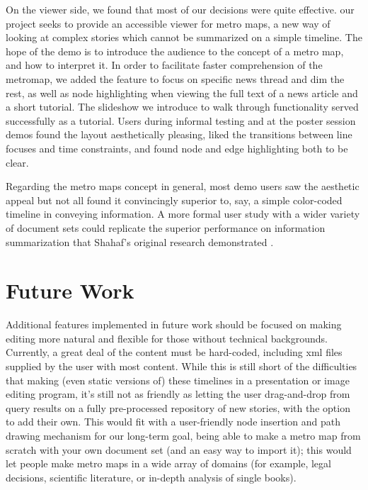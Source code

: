 \documentclass{chi2009}
\begin{document}
On the viewer side, we found that most of our decisions were quite effective. our project seeks to provide an accessible viewer for metro maps, a new way of looking at complex stories which cannot be summarized on a simple timeline. The hope of the demo is to introduce the audience to the concept of a metro map, and how to interpret it.  In order to facilitate faster comprehension of the metromap, we added the feature to focus on specific news thread and dim the rest, as well as node highlighting when viewing the full text of a news article and a short tutorial.   The slideshow we introduce to walk through functionality served successfully as a tutorial. Users during informal testing and at the poster session demos found the layout aesthetically pleasing, liked the transitions between line focuses and time constraints, and found node and edge highlighting both to be clear.

Regarding the metro maps concept in general, most demo users saw the aesthetic appeal but not all found it convincingly superior to, say, a simple color-coded timeline in conveying information. A more formal user study with a wider variety of document sets could replicate the superior performance on information summarization that Shahaf’s original research demonstrated \cite{}.

\section{Future Work}

Additional features implemented in future work should be focused on making editing more natural and flexible for those without technical backgrounds. Currently, a great deal of the content must be hard-coded, including xml files supplied by the user with most content. While this is still short of the difficulties that making (even static versions of) these timelines in a presentation or image editing program, it's still not as friendly as letting the user drag-and-drop from query results on a fully pre-processed repository of new stories, with the option to add their own. This would fit with a user-friendly node insertion and path drawing mechanism for our long-term goal, being able to make a metro map from scratch with your own document set (and an easy way to import it); this would let people make metro maps in a wide array of domains (for example, legal decisions, scientific literature, or in-depth analysis of single books).
\end{document}

